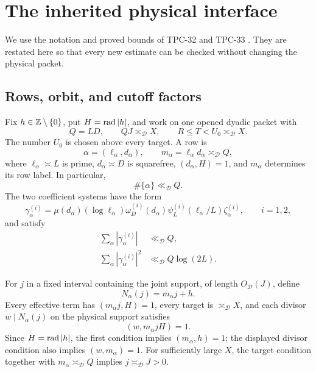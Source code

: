 \section{The inherited physical interface}
\label{sec:tpc34-physical-interface}

We use the notation and proved bounds of TPC-32 and TPC-33
\citep{WangTPC32,WangTPC33}.  They are restated here so that every new
estimate can be checked without changing the physical packet.

\subsection{Rows, orbit, and cutoff factors}

Fix \(h\in\mathbb Z\setminus\{0\}\), put \(H=\operatorname{rad}|h|\), and work on one opened
dyadic packet with
\begin{equation}
 Q=LD,\qquad QJ\asymp_{\mathscr D}X,\qquad
 R\le T<U_0\asymp_{\mathscr D}X.
 \label{eq:tpc34-scales}
\end{equation}
The number \(U_0\) is chosen above every target.  A row is
\begin{equation}
 \alpha=(\ell_\alpha,d_\alpha),\qquad
 m_\alpha=\ell_\alpha d_\alpha\asymp_{\mathscr D}Q,
 \label{eq:tpc34-row}
\end{equation}
where \(\ell_\alpha\asymp L\) is prime,
\(d_\alpha\asymp D\) is squarefree, \((d_\alpha,H)=1\), and \(m_\alpha\)
determines its row label.  In particular,
\begin{equation}
 \#\{\alpha\}\ll_{\mathscr D}Q.
 \label{eq:tpc34-row-count}
\end{equation}
The two coefficient systems have the form
\begin{equation}
 \gamma_\alpha^{(i)}
 =\mu(d_\alpha)(\log\ell_\alpha)
  \omega_D^{(i)}(d_\alpha)
  \psi_L^{(i)}(\ell_\alpha/L)\zeta_\alpha^{(i)},
 \qquad i=1,2,
 \label{eq:tpc34-row-coefficients}
\end{equation}
and satisfy
\begin{align}
 \sum_\alpha|\gamma_\alpha^{(i)}|
 &\ll_{\mathscr D}Q,
 \label{eq:tpc34-row-l1}\\
 \sum_\alpha|\gamma_\alpha^{(i)}|^2
 &\ll_{\mathscr D}Q\log(2L).
 \label{eq:tpc34-row-l2}
\end{align}

For \(j\) in a fixed interval containing the joint support, of length
\(O_{\mathscr D}(J)\), define
\begin{equation}
 N_\alpha(j)=m_\alpha j+h.
 \label{eq:tpc34-target}
\end{equation}
Every effective term has \((m_\alpha j,H)=1\), every target is
\(\asymp_{\mathscr D}X\), and each divisor \(w\mid N_\alpha(j)\) on the
physical support satisfies
\begin{equation}
 (w,m_\alpha jH)=1.
 \label{eq:tpc34-primitivity}
\end{equation}
Since \(H=\operatorname{rad}|h|\), the first condition implies
\((m_\alpha,h)=1\); the displayed divisor condition also implies
\((w,m_\alpha)=1\).
For sufficiently large \(X\), the target condition together with
\(m_\alpha\asymp_{\mathscr D}Q\) implies
\(j\asymp_{\mathscr D}J>0\).

